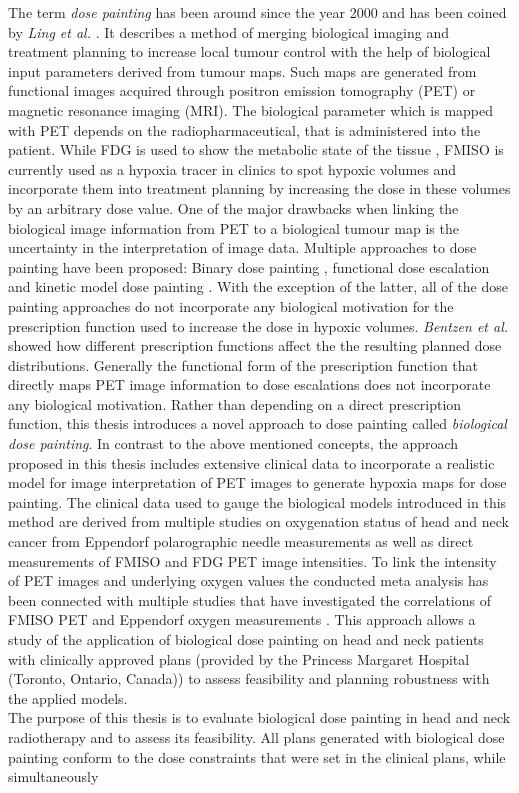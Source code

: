 The term \textit{dose painting} has been around since the year 2000 and has been coined by \textit{Ling et al.} \cite{pmid10837935}. It describes a method of merging biological imaging and treatment planning to increase local tumour control with the help of biological input parameters derived from tumour maps. Such maps are generated from functional images acquired through positron emission tomography (PET) or magnetic resonance imaging (MRI). The biological parameter which is mapped with PET depends on the radiopharmaceutical, that is administered into the patient. While FDG is used to show the metabolic state of the tissue \cite{pmid16841141}, FMISO is currently used as a hypoxia tracer in clinics to spot hypoxic volumes and incorporate them into treatment planning by increasing the dose in these volumes by an arbitrary dose value. One of the major drawbacks when linking the biological image information from PET to a biological tumour map is the uncertainty in the interpretation of image data. Multiple approaches to dose painting have been proposed: Binary dose painting \cite{pmid20855118, pmid11240261, pmid17869020}, functional dose escalation \cite{pmid12587912, pmid21356478, pmid20643512, pmid18635895} and kinetic model dose painting \cite{pmid17448882}. With the exception of the latter, all of the dose painting approaches do not incorporate any biological motivation for the prescription function used to increase the dose in hypoxic volumes. \textit{Bentzen et al.} \cite{pmid19218733} showed how different prescription functions affect the the resulting planned dose distributions. Generally the functional form of the prescription function that directly maps PET image information to dose escalations does not incorporate any biological motivation. Rather than depending on a direct prescription function, this thesis introduces a novel approach to dose painting called \textit{biological dose painting}. In contrast to the above mentioned concepts, the approach proposed in this thesis includes extensive clinical data to incorporate a realistic model for image interpretation of PET images to generate hypoxia maps for dose painting. The clinical data used to gauge the biological models introduced in this method are derived from multiple studies on oxygenation status of head and neck cancer from Eppendorf polarographic needle measurements as well as direct measurements of FMISO and FDG PET image intensities. To link the intensity of PET images and underlying oxygen values the conducted meta analysis has been connected with multiple studies that have investigated the correlations of FMISO PET and Eppendorf oxygen measurements \cite{pmid17598907, pmid12865184, pmid20831480}. This approach allows a study of the application of biological dose painting on head and neck patients with clinically approved plans (provided by the Princess Margaret Hospital (Toronto, Ontario, Canada)) to assess feasibility and planning robustness with the applied models.\\The purpose of this thesis is to evaluate biological dose painting in head and neck radiotherapy and to assess its feasibility. All plans generated with biological dose painting conform to the dose constraints that were set in the clinical plans, while simultaneously 